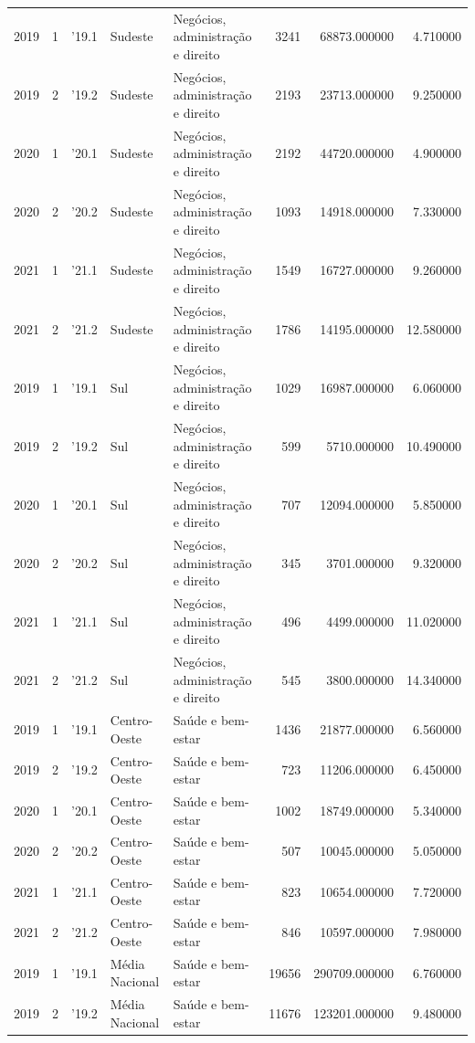 \begin{longtable}{rrlllrrr}
2019 & 1 & '19.1 & Sudeste & Negócios, administração e direito & 3241 & 68873.000000 & 4.710000 \\
2019 & 2 & '19.2 & Sudeste & Negócios, administração e direito & 2193 & 23713.000000 & 9.250000 \\
2020 & 1 & '20.1 & Sudeste & Negócios, administração e direito & 2192 & 44720.000000 & 4.900000 \\
2020 & 2 & '20.2 & Sudeste & Negócios, administração e direito & 1093 & 14918.000000 & 7.330000 \\
2021 & 1 & '21.1 & Sudeste & Negócios, administração e direito & 1549 & 16727.000000 & 9.260000 \\
2021 & 2 & '21.2 & Sudeste & Negócios, administração e direito & 1786 & 14195.000000 & 12.580000 \\
2019 & 1 & '19.1 & Sul & Negócios, administração e direito & 1029 & 16987.000000 & 6.060000 \\
2019 & 2 & '19.2 & Sul & Negócios, administração e direito & 599 & 5710.000000 & 10.490000 \\
2020 & 1 & '20.1 & Sul & Negócios, administração e direito & 707 & 12094.000000 & 5.850000 \\
2020 & 2 & '20.2 & Sul & Negócios, administração e direito & 345 & 3701.000000 & 9.320000 \\
2021 & 1 & '21.1 & Sul & Negócios, administração e direito & 496 & 4499.000000 & 11.020000 \\
2021 & 2 & '21.2 & Sul & Negócios, administração e direito & 545 & 3800.000000 & 14.340000 \\
2019 & 1 & '19.1 & Centro-Oeste & Saúde e bem-estar & 1436 & 21877.000000 & 6.560000 \\
2019 & 2 & '19.2 & Centro-Oeste & Saúde e bem-estar & 723 & 11206.000000 & 6.450000 \\
2020 & 1 & '20.1 & Centro-Oeste & Saúde e bem-estar & 1002 & 18749.000000 & 5.340000 \\
2020 & 2 & '20.2 & Centro-Oeste & Saúde e bem-estar & 507 & 10045.000000 & 5.050000 \\
2021 & 1 & '21.1 & Centro-Oeste & Saúde e bem-estar & 823 & 10654.000000 & 7.720000 \\
2021 & 2 & '21.2 & Centro-Oeste & Saúde e bem-estar & 846 & 10597.000000 & 7.980000 \\
2019 & 1 & '19.1 & Média Nacional & Saúde e bem-estar & 19656 & 290709.000000 & 6.760000 \\
2019 & 2 & '19.2 & Média Nacional & Saúde e bem-estar & 11676 & 123201.000000 & 9.480000 \\

\end{longtable}
